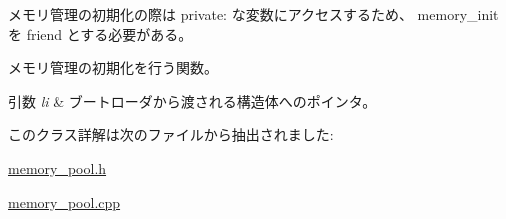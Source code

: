 メモリ管理の初期化の際は private\+: な変数にアクセスするため、 memory\+\_\+init を friend とする必要がある。

メモリ管理の初期化を行う関数。 
\begin{DoxyParams}{引数}
{\em li} & ブートローダから渡される構造体へのポインタ。 \\
\hline
\end{DoxyParams}


このクラス詳解は次のファイルから抽出されました\+:\begin{DoxyCompactItemize}
\item 
\hyperlink{memory__pool_8h}{memory\+\_\+pool.\+h}\item 
\hyperlink{memory__pool_8cpp}{memory\+\_\+pool.\+cpp}\end{DoxyCompactItemize}
